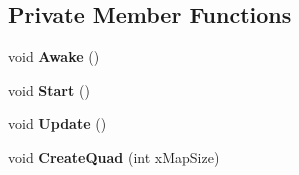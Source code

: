 \subsection*{Private Member Functions}
\begin{DoxyCompactItemize}
\item 
\mbox{\label{class_assets_1_1_scripts_1_1_mesh_generation_a30849dcee23c658732c99ad36d84dc58}} 
void {\bfseries Awake} ()
\item 
\mbox{\label{class_assets_1_1_scripts_1_1_mesh_generation_a41b690987228c88da57a68df85864fb8}} 
void {\bfseries Start} ()
\item 
\mbox{\label{class_assets_1_1_scripts_1_1_mesh_generation_a4cb917bfef5c78eba6e24157eb187e4d}} 
void {\bfseries Update} ()
\item 
\mbox{\label{class_assets_1_1_scripts_1_1_mesh_generation_a62d43347495810972a55224a8ff7a7a1}} 
void {\bfseries Create\+Quad} (int x\+Map\+Size)
\end{DoxyCompactItemize}
